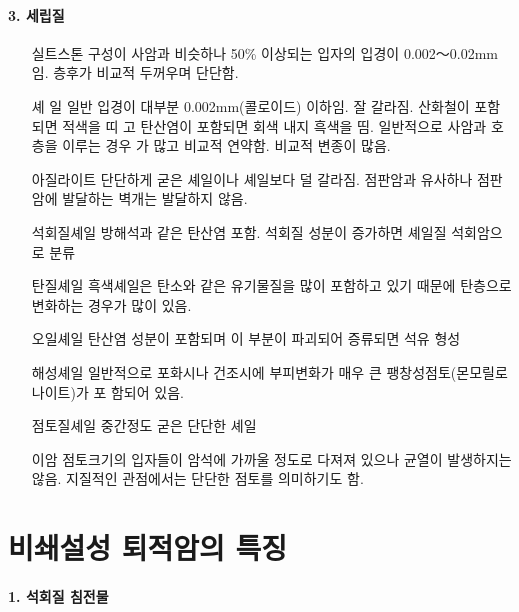 \documentclass[12pt, a4paper, twoside]{book}
\begin{document}
			
		\paragraph{3. 세립질}

			\begin{itemize}[topsep=0.0em, parsep=0.0em, itemsep=0em, leftmargin=10.0em, labelwidth=3em, labelsep=3em] 
			\item [실트스톤] 	구성이 사암과 비슷하나 50\% 이상되는 입자의 입경이 0.002～0.02mm 임.
							층후가 비교적 두꺼우며 단단함.
			\item [셰 일 일반] 입경이 대부분 0.002mm(콜로이드) 이하임. 잘 갈라짐. 산화철이 포함되면 적색을 띠   고 탄산염이 포함되면 회색 내지 흑색을 띰. 일반적으로 사암과 호층을 이루는 경우   가 많고 비교적 연약함. 비교적 변종이 많음.
			\item [아질라이트] 단단하게 굳은 셰일이나 셰일보다 덜 갈라짐. 점판암과 유사하나 점판암에 발달하는   벽개는 발달하지 않음. 
			\item [석회질셰일] 방해석과 같은 탄산염 포함. 석회질 성분이 증가하면 셰일질 석회암으로 분류
			\item [탄질셰일]	흑색셰일은 탄소와 같은 유기물질을 많이 포함하고 있기 때문에 탄층으로 변화하는   경우가 많이 있음.
			\item [오일셰일]	탄산염 성분이 포함되며 이 부분이 파괴되어 증류되면 석유 형성
			\item [해성셰일]	일반적으로 포화시나 건조시에 부피변화가 매우 큰 팽창성점토(몬모릴로나이트)가 포   함되어 있음. 
			\item [점토질셰일]	중간정도 굳은 단단한 셰일
			\item [이암]		점토크기의 입자들이 암석에 가까울 정도로 다져져 있으나 균열이 발생하지는 않음.   지질적인 관점에서는 단단한 점토를 의미하기도 함.
			\end{itemize}

	\clearpage
	\section{비쇄설성 퇴적암의 특징}
		

		\paragraph{1. 석회질 침전물}
\end{document}
